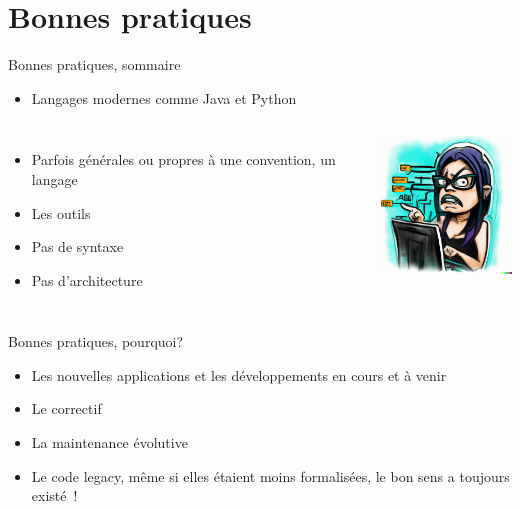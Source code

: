 \documentclass{beamer}
\begin{document}
    \section{Bonnes pratiques}\label{sec:bonnes-pratiques}

    \begin{frame}{Bonnes pratiques, sommaire}
        \begin{itemize}
            \item Langages modernes comme Java et Python
        \end{itemize}
        \begin{columns}
            \begin{itemize}
                \item Parfois générales ou propres à une convention, un langage
                \item Les outils
                \item Pas de syntaxe 
                \item Pas d'architecture 
            \end{itemize}
            \centering
            \includegraphics[width=4cm]{image/maniac-programmer-sorting-her-code}
        \end{columns}
    \end{frame}

    \begin{frame}{Bonnes pratiques, pourquoi?}
        \begin{itemize}
            \item Les nouvelles applications et les développements en cours et à venir
            \item Le correctif
            \item La maintenance évolutive
            \item Le code legacy, même si elles étaient moins formalisées, le bon sens a toujours existé~!
        \end{itemize}
    \end{frame}
\end{document}
